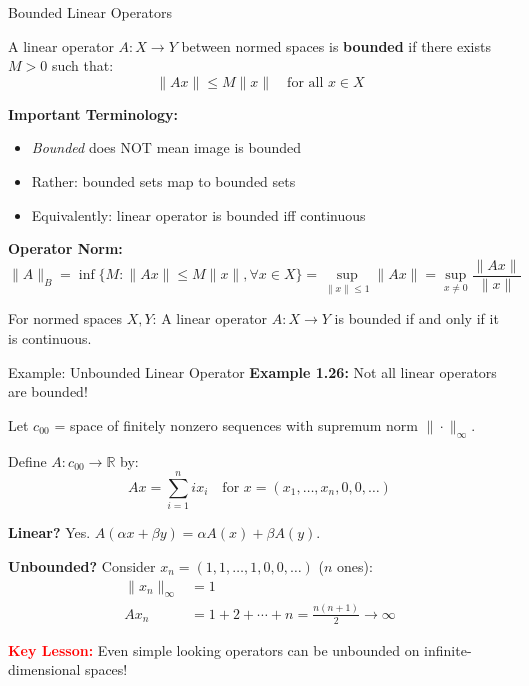 \documentclass[aspectratio=169,10pt]{beamer}
\begin{document}
\begin{frame}{Bounded Linear Operators}
  \begin{definition}
    A linear operator $A : X \to Y$ between normed spaces is \textbf{bounded} if there exists $M > 0$ such that:
    $$\|Ax\| \leq M\|x\| \quad \text{for all } x \in X$$
  \end{definition}

  \vspace{0.3cm}
  \textbf{Important Terminology:}
  \begin{itemize}
    \item \textit{Bounded} does NOT mean image is bounded
    \item Rather: bounded sets map to bounded sets
    \item Equivalently: linear operator is bounded iff continuous
  \end{itemize}

  \vspace{0.3cm}
  \textbf{Operator Norm:}
  $$\|A\|_B = \inf\{M : \|Ax\| \leq M\|x\|, \forall x \in X\} = \sup_{\|x\| \leq 1} \|Ax\| = \sup_{x \neq 0} \frac{\|Ax\|}{\|x\|}$$

  \vspace{0.3cm}
  \begin{theorem}[Theorem 1.13]
    For normed spaces $X, Y$: A linear operator $A : X \to Y$ is bounded if and only if it is continuous.
  \end{theorem}
\end{frame}

\begin{frame}{Example: Unbounded Linear Operator}
  \textbf{Example 1.26:} Not all linear operators are bounded!

  \vspace{0.3cm}
  Let $c_{00}$ = space of finitely nonzero sequences with supremum norm $\|\cdot\|_\infty$.

  \vspace{0.3cm}
  Define $A : c_{00} \to \mathbb{R}$ by:
  $$Ax = \sum_{i=1}^{n} i x_i \quad \text{for } x = (x_1, \ldots, x_n, 0, 0, \ldots)$$

  \vspace{0.3cm}
  \textbf{Linear?} Yes. $A(\alpha x + \beta y) = \alpha A(x) + \beta A(y)$.

  \vspace{0.3cm}
  \textbf{Unbounded?} Consider $x_n = (1, 1, \ldots, 1, 0, 0, \ldots)$ ($n$ ones):
  \begin{align*}
    \|x_n\|_\infty &= 1 \\
    Ax_n &= 1 + 2 + \cdots + n = \frac{n(n+1)}{2} \to \infty
  \end{align*}

  \vspace{0.2cm}

  \vspace{0.3cm}
  \textcolor{red}{\textbf{Key Lesson:}} Even simple looking operators can be unbounded on infinite-dimensional spaces!
\end{frame}
\end{document}
